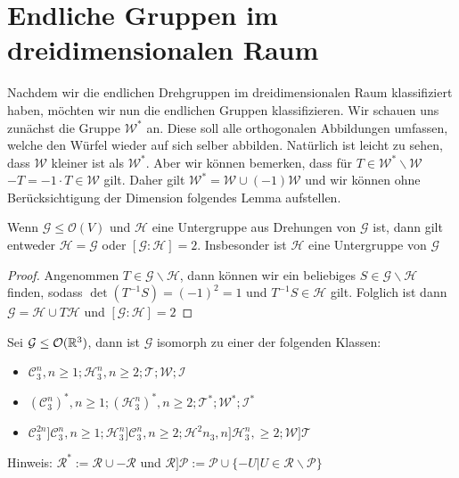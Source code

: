 \section{Endliche Gruppen im dreidimensionalen Raum} 
Nachdem wir die endlichen Drehgruppen im dreidimensionalen Raum klassifiziert haben, möchten wir nun die endlichen Gruppen klassifizieren. Wir schauen uns zunächst die Gruppe $\mathcal{W}^*$ an. Diese soll alle orthogonalen Abbildungen umfassen, welche den Würfel wieder auf sich selber abbilden. Natürlich ist leicht zu sehen, dass $\mathcal{W}$ kleiner ist als $\mathcal{W}^*$. Aber wir können bemerken, dass für $T \in \mathcal{W}^*\backslash\mathcal{W}$ \ $-T = -1 \cdot T \in \mathcal{W}$ gilt. Daher gilt $\mathcal{W}^*=\mathcal{W}\cup(-1)\mathcal{W}$ und wir können ohne Berücksichtigung der Dimension folgendes Lemma aufstellen.
\begin{lemma}
 Wenn $\mathcal{G}\leq\mathcal{O}(V)$ und $\mathcal{H}$ eine Untergruppe aus Drehungen von $\mathcal{G}$ ist, dann gilt entweder $\mathcal{H}=\mathcal{G}$ oder $[\mathcal{G}:\mathcal{H}]=2$. Insbesonder ist $\mathcal{H}$ eine Untergruppe von $\mathcal{G}$ 
\end{lemma}
\begin{proof}
 Angenommen $T\in\mathcal{G}\backslash\mathcal{H}$, dann können wir ein beliebiges $S\in\mathcal{G}\backslash\mathcal{H}$ finden, sodass $\det(T^{-1}S)=(-1)^2=1$ und $T^{-1}S\in\mathcal{H}$ gilt. Folglich ist dann $\mathcal{G}=\mathcal{H}\cup T \mathcal{H}$ und $[\mathcal{G}:\mathcal{H}]=2$
\end{proof}
\begin{theorem}
 Sei $\mathcal{G}\leq{\mathcal{O}(\mathbb{R}^3)}$, dann ist $\mathcal{G}$ isomorph zu einer der folgenden Klassen:
 \begin{itemize}
  \item $\mathcal{C}^n_3,n\geq1;\mathcal{H}^n_3,n\geq2;\mathcal{T};\mathcal{W};\mathcal{I}$
  \item $(\mathcal{C}^n_3)^*,n\geq1;(\mathcal{H}^n_3)^*,n\geq 2;\mathcal{T}^*;\mathcal{W}^*;\mathcal{I}^*$
  \item $\mathcal{C}^{2n}_3]\mathcal{C}^n_3,n\geq1;\mathcal{H}^n_3]\mathcal{C}^n_3,n\geq 2;\mathcal{H}^2n_3,n]\mathcal{H}^n_3,\geq2;\mathcal{W}]\mathcal{T}$
\end{itemize}
Hinweis: $\mathcal{R}^*:=\mathcal{R}\cup -\mathcal{R}$ und $\mathcal{R}]\mathcal{P}:=\mathcal{P}\cup \{-U|U\in \mathcal{R} \backslash \mathcal{P} \}$
\end{theorem}